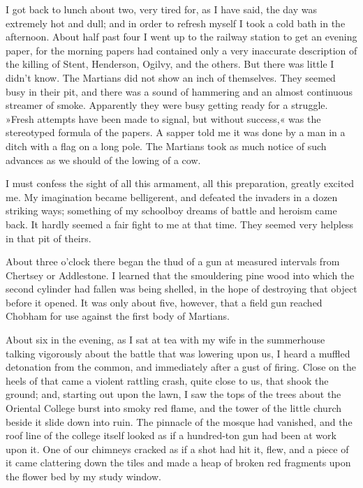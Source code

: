 I got back to lunch about two, very tired for, as I have said, the day was extremely hot and dull; and in order to refresh myself I took a cold bath in the afternoon. About half past four I went up to the railway station to get an evening paper, for the morning papers had contained only a very inaccurate description of the killing of Stent, Henderson, Ogilvy, and the others. But there was little I didn't know. The Martians did not show an inch of themselves. They seemed busy in their pit, and there was a sound of hammering and an almost continuous streamer of smoke. Apparently they were busy getting ready for a struggle. »Fresh attempts have been made to signal, but without success,« was the stereotyped formula of the papers. A sapper told me it was done by a man in a ditch with a flag on a long pole. The Martians took as much notice of such advances as we should of the lowing of a cow.

I must confess the sight of all this armament, all this preparation, greatly excited me. My imagination became belligerent, and defeated the invaders in a dozen striking ways; something of my schoolboy dreams of battle and heroism came back. It hardly seemed a fair fight to me at that time. They seemed very helpless in that pit of theirs.

About three o'clock there began the thud of a gun at measured intervals from Chertsey or Addlestone. I learned that the smouldering pine wood into which the second cylinder had fallen was being shelled, in the hope of destroying that object before it opened. It was only about five, however, that a field gun reached Chobham for use against the first body of Martians.

About six in the evening, as I sat at tea with my wife in the summerhouse talking vigorously about the battle that was lowering upon us, I heard a muffled detonation from the common, and immediately after a gust of firing. Close on the heels of that came a violent rattling crash, quite close to us, that shook the ground; and, starting out upon the lawn, I saw the tops of the trees about the Oriental College burst into smoky red flame, and the tower of the little church beside it slide down into ruin. The pinnacle of the mosque had vanished, and the roof line of the college itself looked as if a hundred-ton gun had been at work upon it. One of our chimneys cracked as if a shot had hit it, flew, and a piece of it came clattering down the tiles and made a heap of broken red fragments upon the flower bed by my study window.


